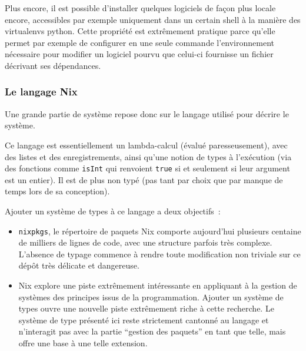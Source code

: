 \begin{description}
    Plus encore, il est possible d'installer quelques logiciels de façon plus
    locale encore, accessibles par exemple uniquement dans un certain shell à
    la manière des virtualenvs python. Cette propriété est extrêmement pratique
    parce qu'elle permet par exemple de configurer en une seule commande
    l'environnement nécessaire pour modifier un logiciel pourvu que celui-ci
    fournisse un fichier décrivant ses dépendances.
\end{description}

\subsubsection{Le langage Nix}

Une grande partie de système repose donc sur le langage utilisé pour décrire le
système.

Ce langage est essentiellement un lambda-calcul (évalué paresseusement), avec
des listes et des enregistrements, ainsi qu'une notion de types à l'exécution
(via des fonctions comme \lstinline{isInt} qui renvoient \lstinline{true} si et
seulement si leur argument est un entier).
Il est de plus non typé (pas tant par choix que par manque de temps lors de sa
conception).

Ajouter un système de types à ce langage a deux objectifs :

\begin{itemize}
  \item \texttt{nixpkgs}, le répertoire de paquets Nix comporte aujourd'hui
    plusieurs centaine de milliers de lignes de code, avec une structure
    parfois très complexe.
    L'absence de typage commence à rendre toute modification non triviale sur
    ce dépôt très délicate et dangereuse.
  \item Nix explore une piste extrêmement intéressante en appliquant à la
    gestion de systèmes des principes issus de la programmation. Ajouter un
    système de types ouvre une nouvelle piste extrêmement riche à cette
    recherche. Le système de type présenté ici reste strictement cantonné au
    langage et n'interagit pas avec la partie ``gestion des paquets'' en tant que
    telle, mais offre une base à une telle extension.
\end{itemize}
